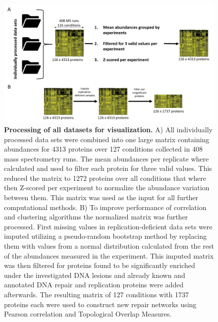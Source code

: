 \begin{figure}[H]
    \centering
    \includegraphics[width=\textwidth]{resources/images/Results/processing_step2.png}
    \caption[Processing of all datasets for visualization.]{\textbf{Processing of all datasets for visualization. }A) All individually processed data sets were combined into one large matrix containing abundances for 4313 proteins over 127 conditions collected in 408 mass spectrometry runs. The mean abundances per replicate where calculated and used to filter each protein for three valid values. This reduced the matrix to 1272 proteins over all conditions that where then Z-scored per experiment to normalize the abundance variation between them. This matrix was used as the input for all further computational methods. B) To improve performance of correlation and clustering algorithms the normalized matrix was further processed. First missing values in replication-deficient data sets were imputed utilizing a pseudo-random bootstrap method by replacing them with values from a normal distribution calculated from the rest of the abundances measured in the experiment. This imputed matrix was then filtered for proteins found to be significantly enriched under the investigated DNA lesions and already known and annotated DNA repair and replication proteins were added afterwards. The resulting matrix of 127 conditions with 1737 proteins each were used to construct new repair networks using Pearson correlation and Topological Overlap Measures.}
    \label{fig:processing}
\end{figure}

